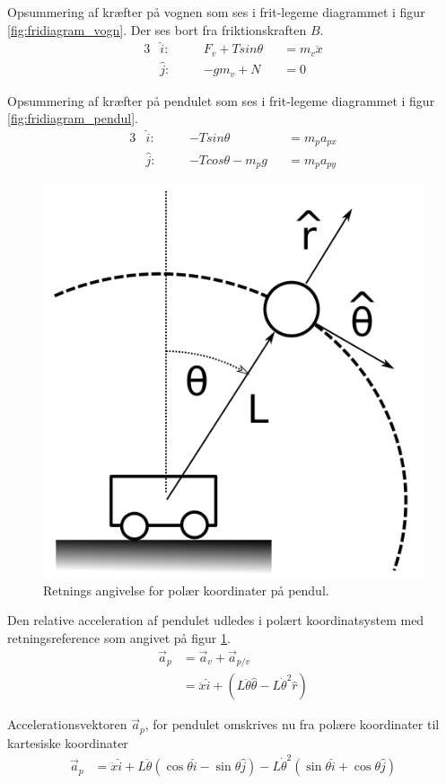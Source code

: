 Opsummering af kræfter på vognen som ses i frit-legeme diagrammet i figur \ref{fig:fridiagram_vogn}. Der ses bort fra friktionskraften $B$. 
\begin{alignat}{3}
&\hat{i} : \quad && F_v + T sin{\theta} && = m_v \ddot{x} \label{eq:vogn_x}\\
&\hat{j} : \quad && -g m_v + N && = 0 
\end{alignat}

Opsummering af kræfter på pendulet som ses i frit-legeme diagrammet i figur \ref{fig:fridiagram_pendul}.
\begin{alignat}{3}
&\hat{i} : \quad &&-T sin{\theta} &&= m_p a_{px}\label{eq:apx}\\
&\hat{j} : \quad &&-T cos{\theta} - m_p g &&= m_p a_{py}\label{eq:apy} 
\end{alignat}

\begin{figure}
	\centering
	\includegraphics[width=.3\textwidth]{billeder/pendul_vogn_polaer.png}
	\caption{Retnings angivelse for polær koordinater på pendul.}
	\label{fig:pendul_vogn_polaer}
\end{figure}

Den relative acceleration af pendulet udledes i polært koordinatsystem med retningsreference som angivet på figur \ref{fig:pendul_vogn_polaer}. 
\begin{align}
\vec{a}_p &= \vec{a}_v + \vec{a}_{p/v} \\
&= \ddot{x} \hat{i} + \left( L\ddot{\theta}\hat{\theta} - L\dot{\theta}^2\hat{r} \right)
\end{align}

Accelerationsvektoren $\vec{a}_p$, for pendulet omskrives nu fra polære koordinater til kartesiske koordinater  
\begin{align}
\vec{a}_p &=  \ddot{x} \hat{i} 
				+ L\ddot{\theta} \left( \cos{\theta}\hat{i} - \sin{\theta}\hat{j} \right) 
				- L\dot{\theta}^2 \left( \sin{\theta}\hat{i} + \cos{\theta}\hat{j} \right) \label{eq:ap}
\end{align} 

